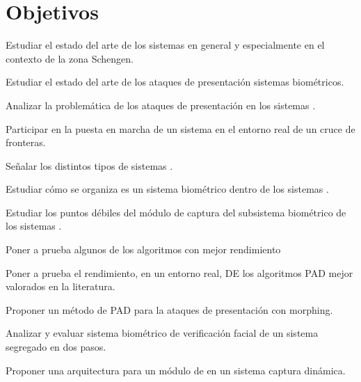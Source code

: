 

\section{Objetivos\label{sec:objetivos}}

Estudiar el estado del arte de los sistemas  en general y especialmente en el contexto de la zona \Gls{Schengen}.

Estudiar el estado del arte de los ataques de presentación sistemas biométricos.

Analizar la problemática de los ataques de presentación en los sistemas .

Participar en la puesta en marcha de un sistema  en el entorno real de un cruce de fronteras.
 
Señalar los distintos tipos de sistemas .

Estudiar cómo se organiza es un sistema biométrico dentro de los sistemas .
  
Estudiar los puntos débiles del módulo de captura del subsistema biométrico de los sistemas .


Poner a prueba algunos de los algoritmos con mejor rendimiento

Poner a prueba el rendimiento, en un entorno real, DE los algoritmos PAD mejor valorados en la literatura.

Proponer un método de PAD para la ataques de presentación con morphing.

Analizar y evaluar sistema biométrico de verificación facial de un sistema  segregado en dos pasos.

Proponer una arquitectura para un módulo de  en un sistema  captura dinámica.



